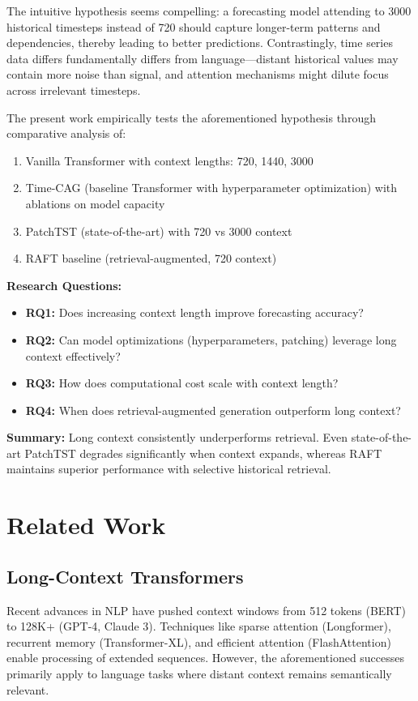 \documentclass[10pt,twocolumn,letterpaper]{article}
\begin{document}
The intuitive hypothesis seems compelling: a forecasting model attending to 3000 historical timesteps instead of 720 should capture longer-term patterns and dependencies, thereby leading to better predictions. Contrastingly, time series data differs fundamentally differs from language---distant historical values may contain more noise than signal, and attention mechanisms might dilute focus across irrelevant timesteps.

The present work empirically tests the aforementioned hypothesis through comparative analysis of:
\begin{enumerate}
    \item Vanilla Transformer with context lengths: 720, 1440, 3000
    \item Time-CAG (baseline Transformer with hyperparameter optimization) with ablations on model capacity
    \item PatchTST (state-of-the-art) with 720 vs 3000 context
    \item RAFT baseline (retrieval-augmented, 720 context)
\end{enumerate}

\noindent\textbf{Research Questions:}
\begin{itemize}
    \item \textbf{RQ1:} Does increasing context length improve forecasting accuracy?
    \item \textbf{RQ2:} Can model optimizations (hyperparameters, patching) leverage long context effectively?
    \item \textbf{RQ3:} How does computational cost scale with context length?
    \item \textbf{RQ4:} When does retrieval-augmented generation outperform long context?
\end{itemize}

\noindent\textbf{Summary:} Long context consistently underperforms retrieval. Even state-of-the-art PatchTST degrades significantly when context expands, whereas RAFT maintains superior performance with selective historical retrieval.

\section{Related Work}

\subsection{Long-Context Transformers}
Recent advances in NLP have pushed context windows from 512 tokens (BERT) to 128K+ (GPT-4, Claude 3). Techniques like sparse attention (Longformer), recurrent memory (Transformer-XL), and efficient attention (FlashAttention) enable processing of extended sequences. However, the aforementioned successes primarily apply to language tasks where distant context remains semantically relevant.
\end{document}
